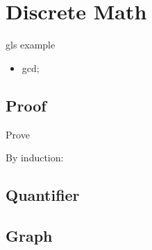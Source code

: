 \chapter{Discrete Math}\label{chp:discrete_math}
\minitoc
gls example
\begin{itemize}
	\item \Gls{gcd};
\end{itemize}

\section{Proof}
\begin{lemma}
\end{lemma}
\begin{claim}
\end{claim}
\begin{theorem}
\end{theorem}
\begin{example}
\end{example}
\begin{fact}
\end{fact}
\begin{remark}
\end{remark}
\begin{exercise}
	Prove
\end{exercise}
\begin{solution}
By induction:
\end{solution}

\lipsum %

\section{Quantifier}
\lipsum %

\section{Graph}
\cite{babaiGraphIsomorphismQuasipolynomial2016}

